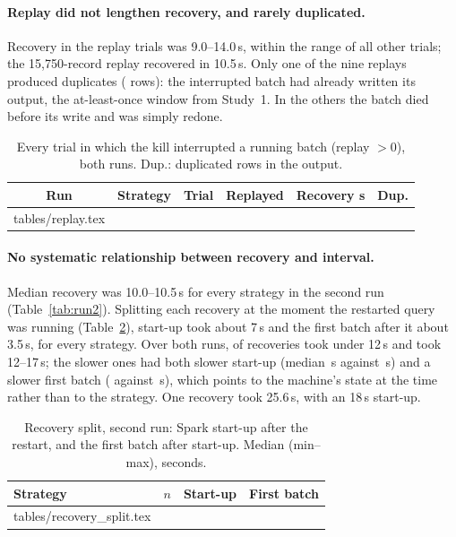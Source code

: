 \documentclass[10pt,twocolumn]{article}
\makeatletter
\def\ReplayRows{\@@input tables/replay.tex }
\def\SplitRows{\@@input tables/recovery_split.tex }
\makeatother
\begin{document}
\paragraph{Replay did not lengthen recovery, and rarely duplicated.}
Recovery in the replay trials was 9.0--14.0\,s, within the range of all other
trials; the 15{,}750-record replay recovered in 10.5\,s. Only one of the nine
replays produced duplicates (\DupRows{} rows): the interrupted batch had
already written its output, the at-least-once window from Study~1. In the
others the batch died before its write and was simply redone.

\begin{table}[t]
\centering\small
\caption{Every trial in which the kill interrupted a running batch (replay
$>0$), both runs. Dup.: duplicated rows in the output.}
\label{tab:replay}
\setlength{\tabcolsep}{4pt}
\begin{tabular}{@{}clrrrr@{}}
\toprule
Run & Strategy & Trial & Replayed & Recovery s & Dup. \\
\midrule
\ReplayRows
\bottomrule
\end{tabular}
\end{table}

\paragraph{No systematic relationship between recovery and interval.}
Median recovery was 10.0--10.5\,s for every strategy in the second run
(Table~\ref{tab:run2}). Splitting each recovery at the moment the restarted
query was running (Table~\ref{tab:split}), start-up took about 7\,s and the
first batch after it about 3.5\,s, for every strategy. Over both runs,
\RecFast{} of \RecAll{} recoveries took under 12\,s and \RecSlow{} took
12--17\,s; the slower ones had both slower start-up (median \SlowStartup\,s
against \FastStartup\,s) and a slower first batch (\SlowFirst{} against
\FastFirst\,s), which points to the machine's state at the time rather than to
the strategy. One recovery took 25.6\,s, with an 18\,s start-up.

\begin{table}[t]
\centering\small
\caption{Recovery split, second run: Spark start-up after the restart, and the
first batch after start-up. Median (min--max), seconds.}
\label{tab:split}
\setlength{\tabcolsep}{4pt}
\begin{tabular}{@{}lrll@{}}
\toprule
Strategy & $n$ & Start-up & First batch \\
\midrule
\SplitRows
\bottomrule
\end{tabular}
\end{table}
\end{document}
